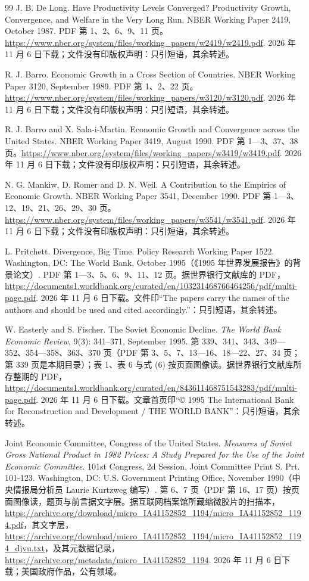 \begin{thebibliography}{99}
 J. B. De Long. Have Productivity Levels Converged? Productivity Growth, Convergence, and Welfare in the Very Long Run. NBER Working Paper 2419, October 1987. PDF 第 1、2、6、9、11 页。\url{https://www.nber.org/system/files/working_papers/w2419/w2419.pdf}. 2026 年 11 月 6 日下载；文件没有印版权声明：只引短语，其余转述。

 R. J. Barro. Economic Growth in a Cross Section of Countries. NBER Working Paper 3120, September 1989. PDF 第 1、2、22 页。\url{https://www.nber.org/system/files/working_papers/w3120/w3120.pdf}. 2026 年 11 月 6 日下载；文件没有印版权声明：只引短语，其余转述。

 R. J. Barro and X. Sala-i-Martin. Economic Growth and Convergence across the United States. NBER Working Paper 3419, August 1990. PDF 第 1—3、37、38 页。\url{https://www.nber.org/system/files/working_papers/w3419/w3419.pdf}. 2026 年 11 月 6 日下载；文件没有印版权声明：只引短语，其余转述。

 N. G. Mankiw, D. Romer and D. N. Weil. A Contribution to the Empirics of Economic Growth. NBER Working Paper 3541, December 1990. PDF 第 1—3、12、19、21、26、29、30 页。\url{https://www.nber.org/system/files/working_papers/w3541/w3541.pdf}. 2026 年 11 月 6 日下载；文件没有印版权声明：只引短语，其余转述。

 L. Pritchett. Divergence, Big Time. Policy Research Working Paper 1522. Washington, DC: The World Bank, October 1995（《1995 年世界发展报告》的背景论文）. PDF 第 1—3、5、6、9、11、12 页。据世界银行文献库的 PDF，\url{https://documents1.worldbank.org/curated/en/103231468766464256/pdf/multi-page.pdf}. 2026 年 11 月 6 日下载。文件印“The papers carry the names of the authors and should be used and cited accordingly.”：只引短语，其余转述。

 W. Easterly and S. Fischer. The Soviet Economic Decline. \emph{The World Bank Economic Review}, 9(3): 341--371, September 1995. 第 339、341、343、349—352、354—358、363、370 页（PDF 第 3、5、7、13—16、18—22、27、34 页；第 339 页是本期目录）；表 1、表 6 与式 (6) 按页面图像读。据世界银行文献库所存整期的 PDF，\url{https://documents1.worldbank.org/curated/en/843611468751543283/pdf/multi-page.pdf}. 2026 年 11 月 6 日下载。文章首页印“© 1995 The International Bank for Reconstruction and Development / THE WORLD BANK”：只引短语，其余转述。

 Joint Economic Committee, Congress of the United States. \emph{Measures of Soviet Gross National Product in 1982 Prices: A Study Prepared for the Use of the Joint Economic Committee}. 101st Congress, 2d Session, Joint Committee Print S. Prt. 101-123. Washington, DC: U.S. Government Printing Office, November 1990（中央情报局分析员 Laurie Kurtzweg 编写）. 第 6、7 页（PDF 第 16、17 页）按页面图像读，题页与前言据文字层。据互联网档案馆所藏缩微胶片的扫描本，\url{https://archive.org/download/micro_IA41152852_1194/micro_IA41152852_1194.pdf}，其文字层，\url{https://archive.org/download/micro_IA41152852_1194/micro_IA41152852_1194_djvu.txt}，及其元数据记录，\url{https://archive.org/metadata/micro_IA41152852_1194}. 2026 年 11 月 6 日下载；美国政府作品，公有领域。


\end{thebibliography}
